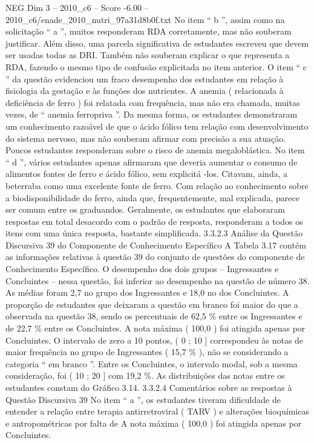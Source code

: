\begin{textsample}{NEG Dim 3 – 2010\_c6 – Score -6.00 – 2010\_c6/enade\_2010\_nutri\_97a31d8b0f.txt}
No item “ b ”, assim como na solicitação “ a ”, muitos responderam RDA corretamente, mas não souberam justificar.
Além disso, uma parcela significativa de estudantes escreveu que devem ser usadas todas as DRI.
Também não souberam explicar o que representa a RDA, fazendo o mesmo tipo de confusão explicitada no item anterior.
O item “ c ” da questão evidenciou um fraco desempenho dos estudantes em relação à fisiologia da gestação e às funções dos nutrientes.
A anemia ( relacionada à deficiência de ferro ) foi relatada com frequência, mas não era chamada, muitas vezes, de “ anemia ferropriva ”.
Da mesma forma, os estudantes demonstraram um conhecimento razoável de que o ácido fólico tem relação com desenvolvimento do sistema nervoso, mas não souberam afirmar com precisão a sua atuação.
Poucos estudantes responderam sobre o risco de anemia megaloblástica.
No item “ d ”, vários estudantes apenas afirmaram que deveria aumentar o consumo de alimentos fontes de ferro e ácido fólico, sem explicitá -los.
Citavam, ainda, a beterraba como uma excelente fonte de ferro.
Com relação ao conhecimento sobre a biodisponibilidade do ferro, ainda que, frequentemente, mal explicada, parece ser comum entre os graduandos.
Geralmente, os estudantes que elaboraram respostas em total desacordo com o padrão de resposta, responderam a todos os itens com uma única resposta, bastante simplificada. 3.3.2.3 Análise da Questão Discursiva 39 do Componente de Conhecimento Específico A Tabela 3.17 contém as informações relativas à questão 39 do conjunto de questões do componente de Conhecimento Específico.
O desempenho dos dois grupos – Ingressantes e Concluintes – nessa questão, foi inferior ao desempenho na questão de número 38.
As médias foram 2,7 no grupo dos Ingressantes e 18,0 no dos Concluintes.
A proporção de estudantes que deixaram a questão em branco foi maior do que a observada na questão 38, sendo os percentuais de 62,5 \% entre os Ingressantes e de 22,7 \% entre os Concluintes.
A nota máxima ( 100,0 ) foi atingida apenas por Concluintes.
O intervalo de zero a 10 pontos, ( 0 ; 10 ] correspondeu às notas de maior frequência no grupo de Ingressantes ( 15,7 \% ), não se considerando a categoria “ em branco ”.
Entre os Concluintes, o intervalo modal, sob a mesma consideração, foi ( 10 ; 20 ] com 19,2 \%.
As distribuições das notas entre os estudantes constam do Gráfico 3.14. 3.3.2.4 Comentários sobre as respostas à Questão Discursiva 39 No item “ a ”, os estudantes tiveram dificuldade de entender a relação entre terapia antirretroviral ( TARV ) e alterações bioquímicas e antropométricas por falta de A nota máxima ( 100,0 ) foi atingida apenas por Concluintes.

\end{textsample}
